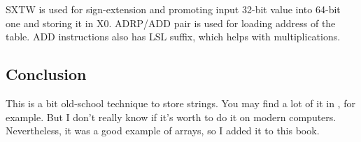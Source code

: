 SXTW is used for sign-extension and promoting input 32-bit value into 64-bit one and storing it in X0.
ADRP/ADD pair is used for loading address of the table.
ADD instructions also has LSL suffix, which helps with multiplications.

\subsection{Conclusion}

This is a bit old-school technique to store strings.
You may find a lot of it in \oracle, for example.
But I don't really know if it's worth to do it on modern computers.
Nevertheless, it was a good example of arrays, so I added it to this book.
\fi
